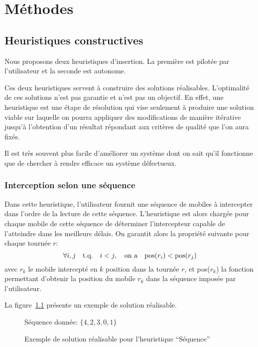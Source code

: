 \chapter{Méthodes}
	\section{Heuristiques constructives}
		Nous proposons deux heuristiques d'insertion. La première est pilotée par l'utilisateur et la seconde est autonome.

		Ces deux heuristiques servent à construire des solutions réalisables. L'optimalité de ces solutions n'est pas garantie et n'est pas un objectif. En effet, une heuristique est une étape de résolution qui vise seulement à produire une solution viable sur laquelle on pourra appliquer des modifications de manière itérative jusqu'à l'obtention d'un résultat répondant aux critères de qualité que l'on aura fixés.

		Il est très souvent plus facile d'améliorer un système dont on sait qu'il fonctionne que de chercher à rendre efficace un système défectueux.
		\subsection{Interception selon une séquence}
		\label{sub:heuristic_sequence}
			Dans cette heuristique, l'utilisateur fournit une séquence de mobiles à intercepter dans l'ordre de la lecture de cette séquence. L'heuristique est alors chargée pour chaque mobile de cette séquence de déterminer l'intercepteur capable de l'atteindre dans les meilleurs délais. On garantit alors la propriété suivante pour chaque tournée $r$:
			\[
				\forall i, j \qtext{t.q.}  i<j, \qtext{on a} \text{pos}(r_i) < \text{pos}(r_j)
			\]
			avec $r_k$ le mobile intercepté en $k$\ieme{} position dans la tournée $r$, et pos($r_k$) la fonction permettant d'obtenir la position du mobile $r_k$ dans la séquence imposée par l'utilisateur.

			La figure~\ref{fig:heuristic_sequence_demo} présente un exemple de solution réalisable.

			\begin{figure}[h!]
			\centering
			Séquence donnée: $\{4, 2, 3, 0, 1\}$

			\begin{tikzpicture}[schema]
				
			\end{tikzpicture}
			\caption{Exemple de solution réalisable pour l'heuristique ``Séquence''}
			\label{fig:heuristic_sequence_demo}
			\end{figure}

